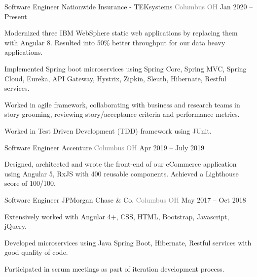 \vspace{-2mm}
\begin{cventries}
    \vspace{-1mm}  \cventry
    {Software Engineer}
    {\hspace*{0.5mm}\bullet \hspace*{0.5mm} Nationwide Insurance - TEKsystems }
    {\textcolor{graytext}{Columbus OH}}
    {Jan 2020 – Present}
    {\begin{cvitems}\item {Modernized three IBM WebSphere static web applications by replacing them with Angular 8. Resulted into 50\% better throughput for our data heavy applications.}\item {Implemented Spring boot microservices using Spring Core, Spring MVC, Spring Cloud, Eureka, API Gateway, Hystrix, Zipkin, Sleuth, Hibernate, Restful services.  } \item {Worked in agile framework, collaborating with business and research teams in story grooming, reviewing story/acceptance criteria and performance metrics.}   \item {Worked in Test Driven Development (TDD) framework using JUnit.}\end{cvitems}   \vspace{-1mm}   
    }
\cventry
    {Software Engineer}
    {\hspace*{0.5mm}\bullet \hspace*{0.5mm} Accenture}
    {\textcolor{graytext}{Columbus OH}}
    {Apr 2019 – July 2019}
    {\begin{cvitems}\item {Designed, architected and wrote the front-end of our eCommerce application using Angular 5, RxJS with 400 reusable components. Achieved a Lighthouse score of 100/100.}
\end{cvitems}   \vspace{-1mm}   
    }   
\cventry
    {Software Engineer}
    {\hspace*{0.5mm}\bullet \hspace*{0.5mm} JPMorgan Chase \& Co.}
    {\textcolor{graytext}{Columbus OH}}
    {May 2017 – Oct 2018}
    {\begin{cvitems}\item {Extensively worked with Angular 4+, CSS, HTML, Bootstrap, Javascript, jQuery. }\item {Developed microservices using Java Spring Boot, Hibernate, Restful services with good quality of code.}\item {Participated in scrum meetings as part of iteration development process.}\end{cvitems}
    }   
\end{cventries}
